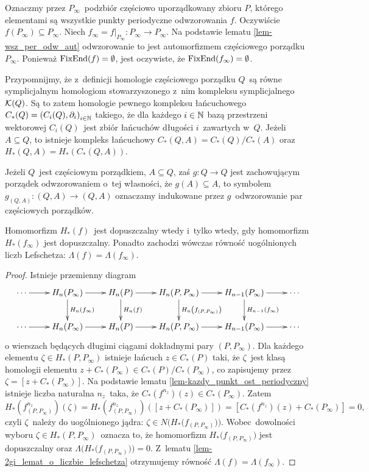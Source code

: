 Oznaczmy przez $P_\infty$~podzbiór częściowo uporządkowany zbioru $P$, którego elementami są wszystkie punkty periodyczne odwzorowania $f$. Oczywiście $f(P_\infty)\subseteq P_\infty$. Niech $f_\infty=f\big |_{P_\infty}\colon P_\infty\to P_\infty$. Na podstawie lematu \ref{lem-wsz_per_odw_aut} odwzorowanie to jest automorfizmem częściowego porządku $P_\infty$. Ponieważ \mbox{$\operatorname{FixEnd}(f)=\emptyset$}, jest oczywiste, że $\operatorname{FixEnd}(f_\infty)=\emptyset$.

Przypomnijmy, że z~definicji homologie częściowego porządku $Q$~są równe symplicjalnym homologiom stowarzyszonego z~nim kompleksu symplicjalnego $\mathcal{K}(Q)$. Są to zatem homologie pewnego kompleksu łańcuchowego $C_*(Q)=\left(C_i(Q),\partial_i\right)_{i\in\mathbb{N}}$ takiego, że dla każdego $i\in\mathbb{N}$ bazą przestrzeni wektorowej $C_i(Q)$~jest zbiór łańcuchów długości $i$~zawartych w~$Q$. Jeżeli $A\subseteq Q$, to istnieje kompleks łańcuchowy $C_*(Q,A)=C_*(Q)\big/C_*(A)$ oraz $H_*(Q,A)=H_*(C_*(Q,A))$.

Jeżeli $Q$~jest częściowym porządkiem, $A\subseteq Q$, zaś $g\colon Q\to Q$ jest zachowującym porządek odwzorowaniem o~tej własności, że $g(A)\subseteq A$, to symbolem $g_{(Q,A)}\colon (Q,A)\to (Q,A)$ oznaczamy indukowane przez $g$~odwzorowanie par częściowych porządków.

\begin{lem}\label{lem-lambda_phi_nsk_rowna_lambda_phi}
Homomorfizm $H_*(f)$~jest dopuszczalny wtedy i~tylko wtedy, gdy homomorfizm $H_*(f_\infty)$ jest dopuszczalny. Ponadto zachodzi wówczas równość uogólnionych liczb Lefschetza: $\Lambda(f)=\Lambda(f_\infty)$.
\end{lem}
\begin{proof}
Istnieje przemienny diagram \[\xymatrix{\cdots \ar[r] & H_n(P_\infty)\ar[r]\ar^{H_n(f_\infty)}[d] & H_n(P)\ar^{H_n(f)}[d]\ar[r] & H_n(P,P_\infty)\ar[r]\ar^{H_n\left(f_{(P,P_\infty)}\right)}[d] & H_{n-1}(P_\infty)\ar[r]\ar^{H_{n-1}(f_\infty)}[d] & \cdots\\ \cdots\ar[r] & H_n(P_\infty)\ar[r] & H_n(P)\ar[r] & H_n(P,P_\infty)\ar[r] & H_{n-1}(P_\infty)\ar[r] & \cdots}\] o wierszach będących długimi ciągami dokładnymi pary $(P,P_\infty)$. Dla każdego elementu $\zeta\in H_*(P,P_\infty)$ istnieje łańcuch $z\in C_*(P)$ taki, że $\zeta$~jest klasą homologii elementu $z+C_*(P_\infty)\in C_*(P)\big/C_*(P_\infty)$, co zapisujemy przez $\zeta=[z+C_*(P_\infty)]$. Na podstawie lematu \ref{lem-kazdy_punkt_ost_periodyczny} istnieje liczba naturalna $n_z$~taka, że $C_*(f^{n_z})(z)\in C_*(P_\infty)$. Zatem \[H_*\left(f^{n_z}_{(P,P_\infty)}\right)(\zeta)=H_*\left(f^{n_z}_{(P,P_\infty)}\right)([z+C_*(P_\infty)])=[C_*(f^{n_z})(z)+C_*(P_\infty)]=0,\] czyli $\zeta$~należy do uogólnionego jądra: $\zeta\in N\bigl(H_*\bigl(f_{(P,P_\infty)}\bigr)\bigr)$. Wobec~dowolności wyboru $\zeta\in H_*(P,P_\infty)$~oznacza to, że homomorfizm $H_*\bigl(f_{(P,P_\infty)}\bigr)$ jest dopuszczalny oraz $\Lambda\bigl(H_*\bigl(f_{(P,P_\infty)}\bigr)\bigr)=0$. Z~lematu \ref{lem-2gi_lemat_o_liczbie_lefschetza} otrzymujemy równość $\Lambda(f)=\Lambda(f_\infty)$.
\end{proof}


